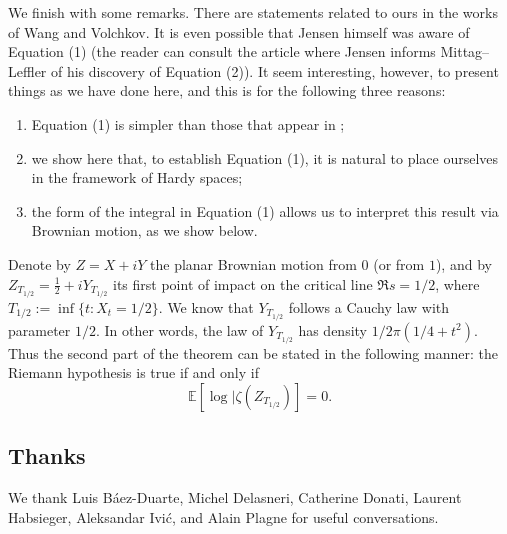 \documentclass[
  letterpaper,
  DIV=11,
  numbers=noendperiod]{scrartcl}
\providecommand{\tightlist}{%
  \setlength{\itemsep}{0pt}\setlength{\parskip}{0pt}}
\theoremstyle{remark}
\begin{document}

We finish with some remarks. There are statements related to ours in the
works \autocite{7,6} of Wang and Volchkov. It is even possible that
Jensen himself was aware of Equation (1) (the reader can consult the
article \autocite{3} where Jensen informs Mittag--Leffler of his
discovery of Equation (2)). It seem interesting, however, to present
things as we have done here, and this is for the following three
reasons:

\begin{enumerate}
\def\labelenumi{\alph{enumi}.}
\tightlist
\item
  Equation (1) is simpler than those that appear in \autocite{7,6};
\item
  we show here that, to establish Equation (1), it is natural to place
  ourselves in the framework of Hardy spaces;
\item
  the form of the integral in Equation (1) allows us to interpret this
  result via Brownian motion, as we show below.
\end{enumerate}

Denote by \(Z=X+iY\) the planar Brownian motion from \(0\) (or from
\(1\)), and by \(Z_{T_{1/2}}=\frac12+iY_{T_{1/2}}\) its first point of
impact on the critical line \(\Re s=1/2\), where
\(T_{1/2}:=\inf\{t:X_t=1/2\}\). We know that \(Y_{T_{1/2}}\) follows a
Cauchy law with parameter \(1/2\). In other words, the law of
\(Y_{T_{1/2}}\) has density \(1/2\pi(1/4+t^2)\). Thus the second part of
the theorem can be stated in the following manner: the Riemann
hypothesis is true if and only if \[
  \mathbb{E}[\log\vert\zeta(Z_{T_{1/2}})] = 0.
\]

\subsection*{Thanks}\label{thanks}

We thank Luis Báez-Duarte, Michel Delasneri, Catherine Donati, Laurent
Habsieger, Aleksandar Ivić, and Alain Plagne for useful conversations.


\nocite{*}
\printbibliography
\end{document}
